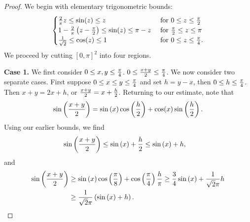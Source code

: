 \documentclass[10pt,a4paper]{amsart}
\begin{document}
\begin{proof}
We begin with elementary trigonometric bounds:
\[
\begin{cases}
{2\over \pi } z \leq \sin(z) \leq z &  \hbox{ for } 0 \leq z \leq {\pi \over 2} \\
1 - {2\over \pi } \left( z - {\pi \over 2} \right) \leq \sin(z) \leq \pi - z & \hbox{ for } {\pi \over 2} \leq z \leq {\pi }  \\
{1\over \sqrt{2}}  \leq \cos(z) \leq 1 &  \hbox{ for } 0 \leq z \leq {\pi \over 4}.
\end{cases}
\]
We proceed by cutting $[0,\pi]^2$ into four regions.

\textbf{Case 1.} We first consider $0\leq x,y \leq {\pi \over 4}$.  
$0 \leq {x + y \over 2} \leq {\pi \over 4}$.
We now consider two separate cases.  First suppose $0 \leq x \leq y \leq {\pi \over 4}$ and set $h = y-x$, then $0 \leq h \leq {\pi \over 4}$.  Then 
$x + y = 2x + h$, or ${x + y \over 2} = x + {h\over 2}$.  Returning to our estimate, note that
\[
\sin \left( {x + y\over 2} \right)
= \sin \left( x \right) \cos \left( {h\over 2} \right) + \cos(x) \sin\left( {h\over 2} \right).
\]
Using our earlier bounds, we find
\begin{align*}
\sin \left( {x + y\over 2} \right)
& \leq  \sin\left( x \right)  + {h \over 2}  \leq  \sin\left( x \right) + h ,
\end{align*}
and 
\begin{align*}
\sin \left( {x + y\over 2} \right) 
& \geq  \sin\left(x \right) \cos\left( {\pi \over 8} \right)+ \cos\left({\pi \over 4} \right) {h \over \pi}   \geq {3 \over 4} \sin\left( x\right) + {1 \over \sqrt{2} \pi}h \\
& \geq {1 \over \sqrt{2}\pi} \left( \sin\left( x\right) + h \right).
\end{align*}


\end{proof}
\end{document}
